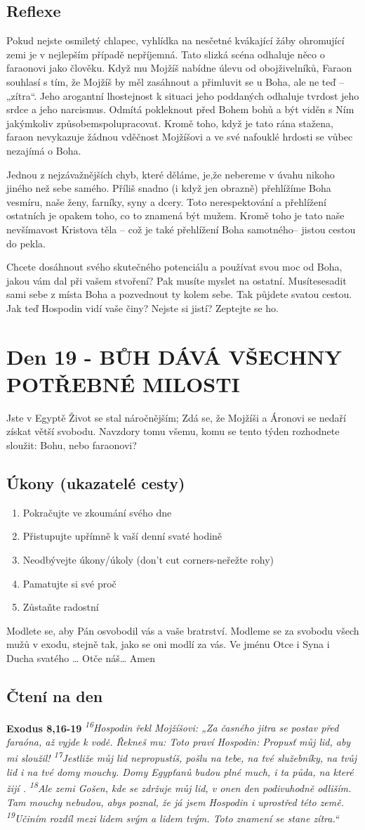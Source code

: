 \documentclass[11pt]{article}
\newcommand{\zacatekTretiTyden}{
  Jste v Egyptě \newline
  Život se stal náročnějším; Zdá se, že Mojžíši a Áronovi se nedaří získat větší svobodu. Navzdory tomu všemu,
komu se tento týden rozhodnete sloužit: Bohu, nebo faraonovi?

\subsection*{Úkony (ukazatelé cesty)}
\begin{enumerate}
  \item Pokračujte ve zkoumání svého dne
  \item Přistupujte upřímně k vaší denní svaté hodině
  \item Neodbývejte úkony/úkoly (don’t cut corners-neřežte rohy)
  \item Pamatujte si své proč
  \item Zůstaňte radostní
\end{enumerate}
Modlete se, aby Pán osvobodil vás a vaše bratrství. \newline
Modleme se za svobodu všech mužů v exodu, stejně tak, jako se oni modlí za vás.\newline
Ve jménu Otce i Syna i Ducha svatého …  Otče náš… Amen
}
\begin{document}
\subsection*{Reflexe}

Pokud nejste osmiletý chlapec, vyhlídka na nesčetné kvákající žáby ohromující zemi je v nejlepším případě
nepříjemná. Tato slizká scéna odhaluje něco o faraonovi jako člověku. Když mu Mojžíš nabídne úlevu od
obojživelníků, Faraon souhlasí s tím, že Mojžíš by měl zasáhnout a přimluvit se u Boha, ale ne teď – „zítra“. Jeho
arogantní lhostejnost k situaci jeho poddaných odhaluje tvrdost jeho srdce a jeho narcismus. Odmítá pokleknout
před Bohem bohů a být viděn s Ním jakýmkoliv způsobemspolupracovat. Kromě toho, když je tato rána stažena,
faraon nevykazuje žádnou vděčnost Mojžíšovi a ve své nafouklé hrdosti se vůbec nezajímá o Boha.

Jednou z nejzávažnějších chyb, které děláme, je,že nebereme v úvahu nikoho jiného než sebe samého. Příliš snadno
(i když jen obrazně) přehlížíme Boha vesmíru, naše ženy, farníky, syny a dcery. Toto nerespektování a přehlížení
ostatních je opakem toho, co to znamená být mužem. Kromě toho je tato naše nevšímavost Kristova těla – což je
také přehlížení Boha samotného– jistou cestou do pekla.

Chcete dosáhnout svého skutečného potenciálu a používat svou moc od Boha, jakou vám dal při vašem stvoření?
Pak musíte myslet na ostatní. Musítesesadit sami sebe z místa Boha a pozvednout ty kolem sebe. Tak půjdete
svatou cestou. Jak teď Hospodin vidí vaše činy? Nejste si jistí? Zeptejte se ho.

\newpage
\section{Den 19 - BŮH DÁVÁ VŠECHNY POTŘEBNÉ MILOSTI}
\zacatekTretiTyden
\subsection*{Čtení na den}
\textbf{Exodus 8,16-19}
\newline
\textit{
\textsuperscript{16}Hospodin řekl Mojžíšovi: „Za časného jitra se postav před faraóna, až vyjde k vodě. Řekneš mu: Toto praví Hospodin: Propusť můj lid, aby mi sloužil!
\textsuperscript{17}Jestliže můj lid nepropustíš, pošlu na tebe, na tvé služebníky, na tvůj lid i na tvé domy mouchy. Domy Egypťanů budou plné much, i ta půda, na které žijí .
\textsuperscript{18}Ale zemi Gošen, kde se zdržuje můj lid, v onen den podivuhodně odliším. Tam mouchy nebudou, abys poznal, že já jsem Hospodin i uprostřed této země.
\textsuperscript{19}Učiním rozdíl mezi lidem svým a lidem tvým. Toto znamení se stane zítra.“
}
\end{document}

